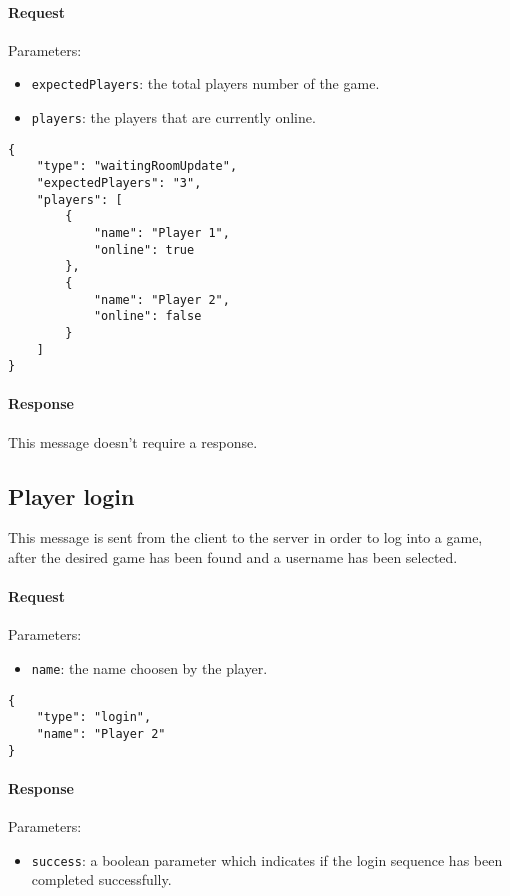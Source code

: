 \documentclass[a4paper]{article}
\begin{document}
	\paragraph{Request} Parameters:

	\begin{itemize}
		\item \verb|expectedPlayers|: the total players number of the game.
		\item \verb|players|: the players that are currently online.
	\end{itemize}

	\begin{verbatim}
{
	"type": "waitingRoomUpdate",
	"expectedPlayers": "3",
	"players": [
		{
			"name": "Player 1",
			"online": true
		},
		{
			"name": "Player 2",
			"online": false
		}
	]
}
	\end{verbatim}

	\paragraph{Response} This message doesn't require a response.

	\subsection{Player login}

	This message is sent from the client to the server in order to log into a game, after the desired game has been found and a username has been selected.

	\paragraph{Request} Parameters:

	\begin{itemize}
		\item \verb|name|: the name choosen by the player.
	\end{itemize}

	\begin{verbatim}
{
	"type": "login",
	"name": "Player 2"
}
	\end{verbatim}

	\paragraph{Response} Parameters:

	\begin{itemize}
		\item \verb|success|: a boolean parameter which indicates if the login sequence has been completed successfully.
	\end{itemize}
\end{document}
